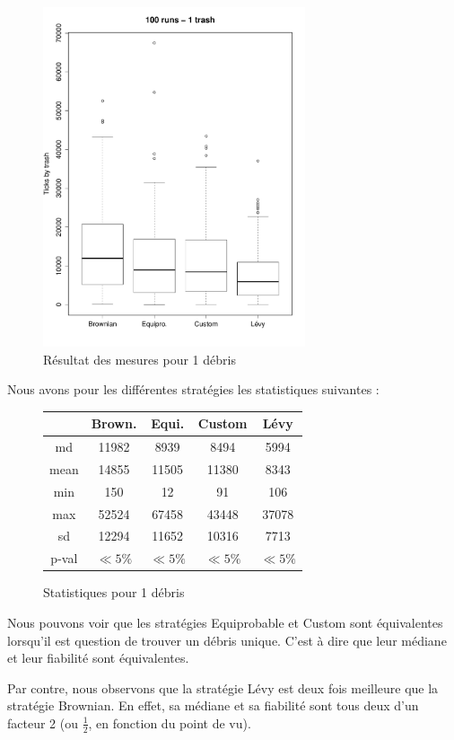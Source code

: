 

\begin{figure}[H]
	\begin{center}
		\includegraphics[height=10cm]{diagrams/1Tr_all.pdf}
		\caption{Résultat des mesures pour 1 débris}
		\label{fig:1Trash}
	\end{center}
\end{figure}


Nous avons pour les différentes stratégies les statistiques suivantes :

\begin{figure}[H]
	\begin{center}
		\begin{tabular}{| c || c | c | c | c | }
			\hline
			&Brown.&Equi.&Custom&Lévy \\
			\hline
			\hline
			md&11982&8939&8494&5994\\
			mean&14855&11505&11380&8343\\
			min&150 & 12 & 91 & 106 \\
			max&52524 & 67458 & 43448 & 37078 \\
			sd&12294&11652&10316&7713\\
			p-val&$\ll 5\%$&$\ll 5\%$&$\ll 5\%$&$\ll 5\%$\\
			\hline
		\end{tabular}
		\caption{{Statistiques pour 1 débris}}
	\end{center}
\end{figure}


Nous pouvons voir que les stratégies Equiprobable et Custom sont
équivalentes lorsqu'il est question de trouver un débris unique.
C'est à dire que leur médiane et leur fiabilité sont équivalentes.

Par contre, nous observons que la stratégie Lévy est deux fois
meilleure que la stratégie Brownian. En effet, sa médiane et sa
fiabilité sont tous deux d'un facteur 2 (ou $\frac{1}{2}$, en fonction du
point de vu).


